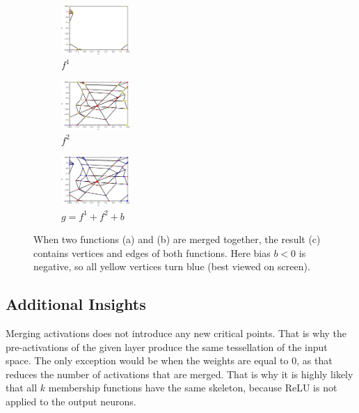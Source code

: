 \documentclass{article}
\begin{document}
\begin{figure}[t]
    \begin{subfigure}{2.6cm}
        \centering
        \includegraphics[width=2.6cm]{Figures/skeleton1.pdf}
        \caption{$f^1$}
        \label{fig:skeleton1}
    \end{subfigure}
    \begin{subfigure}{2.6cm}
        \centering
        \includegraphics[width=2.6cm]{Figures/skeleton2.pdf}
        \caption{$f^2$}
        \label{fig:skeleton2}
    \end{subfigure}
    \begin{subfigure}{2.6cm}
        \centering
        \includegraphics[width=2.6cm]{Figures/skeletons_merged.pdf}
        \caption{$g = f^1 + f^2 + b$}
        \label{fig:merged_skeleton}
    \end{subfigure}
    \caption{When two functions (a) and (b) are merged together, the result (c) contains vertices and edges of both functions. Here bias $b<0$ is negative, so all yellow vertices turn blue (best viewed on screen).}
    \vspace{-3mm}
    \label{fig:example_of_merging_activations}
\end{figure}

\subsection{Additional Insights}
\label{subsec:example_skelex}

Merging activations does not introduce any new critical points. That is why the pre-activations of the given layer produce the same tessellation of the input space. The only exception would be when the weights are equal to $0$, as that reduces the number of activations that are merged. That is why it is highly likely that all $k$ membership functions have the same skeleton, because ReLU is not applied to the output neurons.
\end{document}
